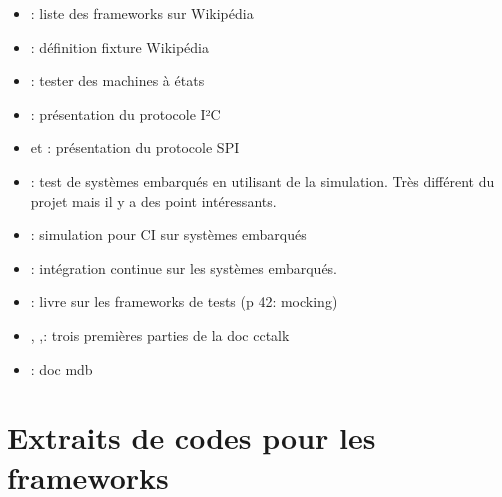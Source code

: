 \documentclass[a4paper]{article}
\newcommand\StartAppendixEntries{}
\renewcommand\StartAppendixEntries{\value{tocdepth}=-10000\relax}%
\edef\maintocdepth{\the\value{tocdepth}}%
\renewcommand\StartAppendixEntries{\value{tocdepth}=\maintocdepth\relax}%
\newcommand*\appendixwithtoc{%
  \clearpage
  \appendix
  \addtocontents{toc}{\protect\StartAppendixEntries}
  \listofatoc
}
\begin{document}
\begin{itemize}
  \item \cite{enwikiframeworks}: liste des frameworks sur Wikipédia
  \item \cite{enwikifixtures}: définition fixture Wikipédia
  \item \cite{teststatemachines}: tester des machines à états
  \item \cite{mankar2014review}: présentation du protocole I²C
  \item \cite{dhaker2018introduction} et \cite{li2014design}: présentation du
    protocole SPI
  \item \cite{articleembeddedtests}: test de systèmes embarqués en utilisant de
    la simulation. Très différent du projet mais il y a des point intéressants.
  \item \cite{engblom2015continuous}: simulation pour CI sur systèmes embarqués
  \item \cite{maartensson2016continuous}: intégration continue sur les systèmes
    embarqués.
  \item \cite{hamill2004unit}: livre sur les frameworks de tests (p 42: mocking)
  \item \cite{cctalkpt1}, \cite{cctalkpt2},\cite{cctalkpt3}: trois premières
    parties de la doc cctalk
  \item \cite{mdbdoc}: doc mdb
\end{itemize}

\clearpage{}
\pagestyle{empty}
\printbibliography[keyword={paper}, title={Bibliographie}]
\printbibliography[keyword={web}, title={Webographie}]

\clearpage
\printglossaries

\appendixwithtoc

\clearpage{}
\section{Extraits de codes pour les frameworks}\label{appendix:frameworks-code}
\end{document}
